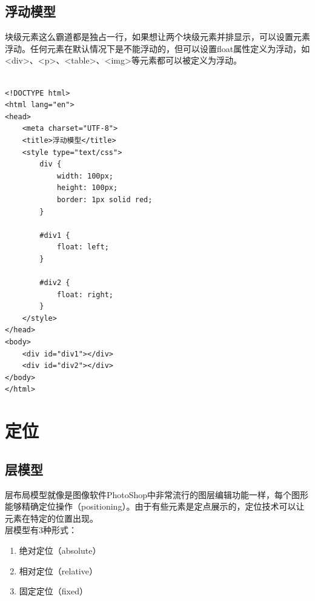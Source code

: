 \vspace{0.5cm}

\subsection{浮动模型}

块级元素这么霸道都是独占一行，如果想让两个块级元素并排显示，可以设置元素浮动。任何元素在默认情况下是不能浮动的，但可以设置float属性定义为浮动，如<div>、<p>、<table>、<img>等元素都可以被定义为浮动。\\

\\

\begin{lstlisting}[style=htmlcssjs]
<!DOCTYPE html>
<html lang="en">
<head>
    <meta charset="UTF-8">
    <title>浮动模型</title>
    <style type="text/css">
        div {
            width: 100px;
            height: 100px;
            border: 1px solid red;
        }

        #div1 {
            float: left;
        }

        #div2 {
            float: right;
        }
    </style>
</head>
<body>
    <div id="div1"></div>
    <div id="div2"></div>
</body>
</html>
\end{lstlisting}

\newpage

\section{定位}

\subsection{层模型}

层布局模型就像是图像软件PhotoShop中非常流行的图层编辑功能一样，每个图形能够精确定位操作（positioning）。由于有些元素是定点展示的，定位技术可以让元素在特定的位置出现。\\

层模型有3种形式：

\begin{enumerate}
	\item 绝对定位（absolute）
	\item 相对定位（relative）
	\item 固定定位（fixed）
\end{enumerate}

\vspace{0.5cm}

